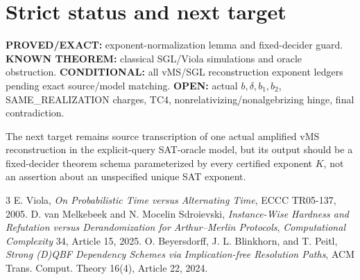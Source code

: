\documentclass[11pt]{article}
\begin{document}
\section*{Strict status and next target}
\textbf{PROVED/EXACT:} exponent-normalization lemma and fixed-decider guard.
\textbf{KNOWN THEOREM:} classical SGL/Viola simulations and oracle obstruction.
\textbf{CONDITIONAL:} all vMS/SGL reconstruction exponent ledgers pending exact source/model matching.
\textbf{OPEN:} actual \(b,\delta,b_1,b_2\), SAME_REALIZATION charges, TC4, nonrelativizing/nonalgebrizing hinge, final contradiction.

The next target remains source transcription of one actual amplified vMS reconstruction in the explicit-query SAT-oracle model, but its output should be a fixed-decider theorem schema parameterized by every certified exponent \(K\), not an assertion about an unspecified unique SAT exponent.

\begin{thebibliography}{3}
 E. Viola, \emph{On Probabilistic Time versus Alternating Time}, ECCC TR05-137, 2005.
 D. van Melkebeek and N. Mocelin Sdroievski, \emph{Instance-Wise Hardness and Refutation versus Derandomization for Arthur--Merlin Protocols}, \emph{Computational Complexity} 34, Article 15, 2025.
 O. Beyersdorff, J. L. Blinkhorn, and T. Peitl, \emph{Strong (D)QBF Dependency Schemes via Implication-free Resolution Paths}, ACM Trans. Comput. Theory 16(4), Article 22, 2024.
\end{thebibliography}
\end{document}
